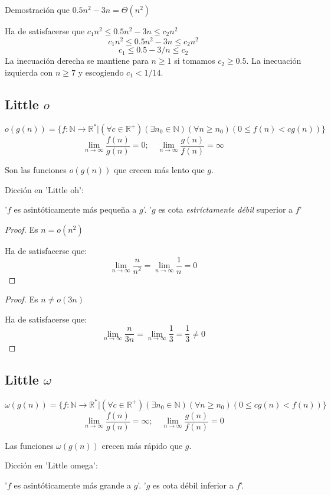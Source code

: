 \begin{example}
	Demostración que $0.5n^2-3n=\Theta(n^2)$

	Ha de satisfacerse que $c_1n^2\le 0.5n^2-3n\le c_2n^2$
	$$
		c_1n^2\le 0.5n^2-3n\le c_2n^2
	$$$$
		c_1\le 0.5-3/n\le c_2
	$$
	La inecuación derecha se mantiene para $n\ge1$ si tomamos $c_2\ge0.5$. La inecuación izquierda con $n\ge7$ y escogiendo $c_1<1/14$.
\end{example}

\subsection{Little $o$}
\begin{definition}
	$$
		o (g(n)) = \{ f : \mathbb N \to \mathbb R^* | (\forall c \in \mathbb R^+) (\exists n_0\in \mathbb N) (\forall n\ge n_0) ( 0 \le  f(n) < cg (n) ) \}
	$$$$
		\lim_{n\to\infty}\frac{f(n)}{g(n)} = 0;\quad
		\lim_{n\to\infty}\frac{g(n)}{f(n)}= \infty
	$$
\end{definition}
Son las funciones $o(g(n))$ que crecen más lento que $g$.
\begin{remark}Dicción en 'Little oh':

	'$f$ es asintóticamente más pequeña a $g$'. '$g$ es cota \textit{estríctamente débil} superior a $f$'
\end{remark}

\begin{proof}
	Es $n=o(n^2)$

	Ha de satisfacerse que: $$
		\lim_{n\to\infty}\frac n{n^2}=\lim_{n\to\infty}\frac 1{n}=0
	$$
\end{proof}
\begin{proof}
	Es $n\neq o(3n)$

	Ha de satisfacerse que: $$
		\lim_{n\to\infty}\frac n{3n}=\lim_{n\to\infty}\frac 13=\frac 13\neq0
	$$
\end{proof}

\subsection{Little $\omega$}
\begin{definition}
	$$
		\omega (g(n)) = \{ f : \mathbb N \to \mathbb R^* | (\forall c\in \mathbb R^+) (\exists n_0\in \mathbb N) (\forall n\ge n_0) ( 0 \le  c g(n) < f(n) ) \}
	$$$$
		\lim_{n\to\infty}\frac{f(n)}{g(n)}= \infty;\quad
		\lim_{n\to\infty}\frac{g(n)}{f(n)}= 0
	$$
\end{definition}
Las funciones $\omega({g(n)})$ crecen más rápido que $g$.
\begin{remark}Dicción en 'Little omega':

	'$f$ es asintóticamente más grande a $g$'. '$g$ es cota débil inferior a $f$'.
\end{remark}

